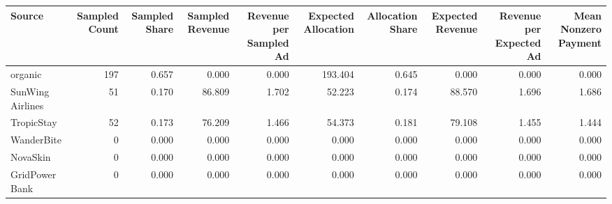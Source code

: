 \begin{tabular}{lrrrrrrrrr}
\hline
Source & Sampled Count & Sampled Share & Sampled Revenue & Revenue per Sampled Ad & Expected Allocation & Allocation Share & Expected Revenue & Revenue per Expected Ad & Mean Nonzero Payment \\
\hline
organic & 197 & 0.657 & 0.000 & 0.000 & 193.404 & 0.645 & 0.000 & 0.000 & 0.000 \\
SunWing Airlines & 51 & 0.170 & 86.809 & 1.702 & 52.223 & 0.174 & 88.570 & 1.696 & 1.686 \\
TropicStay & 52 & 0.173 & 76.209 & 1.466 & 54.373 & 0.181 & 79.108 & 1.455 & 1.444 \\
WanderBite & 0 & 0.000 & 0.000 & 0.000 & 0.000 & 0.000 & 0.000 & 0.000 & 0.000 \\
NovaSkin & 0 & 0.000 & 0.000 & 0.000 & 0.000 & 0.000 & 0.000 & 0.000 & 0.000 \\
GridPower Bank & 0 & 0.000 & 0.000 & 0.000 & 0.000 & 0.000 & 0.000 & 0.000 & 0.000 \\
\hline
\end{tabular}

